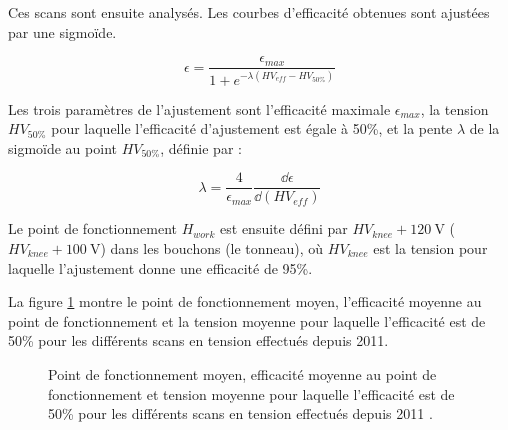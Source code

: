 Ces scans sont ensuite analysés. Les courbes d'efficacité obtenues sont ajustées par une sigmoïde.

\begin{equation}
\epsilon=\frac{\epsilon_{max}}{1+e^{-\lambda\left(HV_{eff}-HV_{50\%}\right)}}
\end{equation}

Les trois paramètres de l'ajustement sont l'efficacité maximale $\epsilon_{max}$, la tension $HV_{50\%}$ pour laquelle l'efficacité d'ajustement est égale à \num{50}\%, et la pente $\lambda$ de la sigmoïde au point $HV_{50\%}$, définie par :

\begin{equation}
\lambda=\frac{4}{\epsilon_{max}}\frac{\dd \epsilon}{\dd \left(HV_{eff}\right)}
\end{equation}

Le point de fonctionnement $H_{work}$ est ensuite défini par $HV_{knee}+\SI{120}{\volt}$ ($HV_{knee}+\SI{100}{\volt}$) dans les bouchons (le tonneau), où $HV_{knee}$ est la tension pour laquelle l'ajustement donne une efficacité de \num{95}\%.

La figure \ref{working} montre le point de fonctionnement moyen, l'efficacité moyenne au point de fonctionnement et la tension moyenne pour laquelle l'efficacité est de \num{50}\% pour les différents scans en tension effectués depuis \num{2011}.
\vspace{0.5cm}
\begin{figure}[ht!]
	\centering
	\hfill
	\caption{Point de fonctionnement moyen, efficacité moyenne au point de fonctionnement et tension moyenne pour laquelle l'efficacité est de \num{50}\% pour les différents scans en tension effectués depuis \num{2011} \cite{working2}.}
	\label{working}
\end{figure}
\newpage
